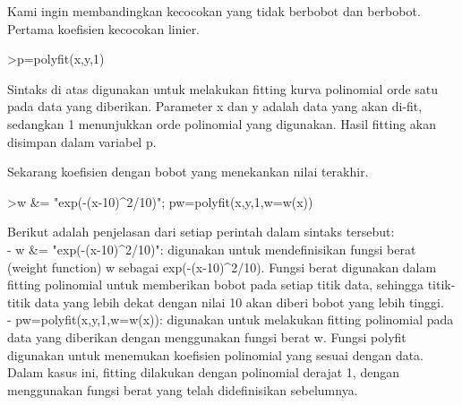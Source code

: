\documentclass[a4paper,10pt]{article}
\begin{document}
\begin{eulernotebook}
\begin{eulercomment}
\begin{eulercomment}
\begin{eulercomment}
\begin{eulercomment}
\begin{eulercomment}
\begin{eulercomment}
\begin{eulercomment}
\begin{eulercomment}
\begin{eulercomment}
\begin{eulercomment}
\begin{eulercomment}
\begin{eulercomment}
\begin{eulercomment}
\begin{eulercomment}
\begin{eulercomment}
\begin{eulercomment}
\begin{eulercomment}
Kami ingin membandingkan kecocokan yang tidak berbobot dan berbobot.
Pertama koefisien kecocokan linier.
\end{eulercomment}
\begin{eulerprompt}
>p=polyfit(x,y,1)
\end{eulerprompt}
\begin{euleroutput}
  [0.733333,  0.812121]
\end{euleroutput}
\begin{eulercomment}
Sintaks di atas digunakan untuk melakukan fitting kurva polinomial
orde satu pada data yang diberikan. Parameter x dan y adalah data yang
akan di-fit, sedangkan 1 menunjukkan orde polinomial yang digunakan.
Hasil fitting akan disimpan dalam variabel p.

Sekarang koefisien dengan bobot yang menekankan nilai terakhir.
\end{eulercomment}
\begin{eulerprompt}
>w &= "exp(-(x-10)^2/10)"; pw=polyfit(x,y,1,w=w(x))
\end{eulerprompt}
\begin{euleroutput}
  [4.71566,  0.38319]
\end{euleroutput}
\begin{eulercomment}
Berikut adalah penjelasan dari setiap perintah dalam sintaks tersebut:\\
- w \&= "exp(-(x-10)\textasciicircum{}2/10)": digunakan untuk mendefinisikan fungsi
berat (weight function) w sebagai exp(-(x-10)\textasciicircum{}2/10). Fungsi berat
digunakan dalam fitting polinomial untuk memberikan bobot pada setiap
titik data, sehingga titik-titik data yang lebih dekat dengan nilai 10
akan diberi bobot yang lebih tinggi.\\
- pw=polyfit(x,y,1,w=w(x)): digunakan untuk melakukan fitting
polinomial pada data yang diberikan dengan menggunakan fungsi berat w.
Fungsi polyfit digunakan untuk menemukan koefisien polinomial yang
sesuai dengan data. Dalam kasus ini, fitting dilakukan dengan
polinomial derajat 1, dengan menggunakan fungsi berat yang telah
didefinisikan sebelumnya.


\end{eulercomment}
\end{eulercomment}
\end{eulercomment}
\end{eulercomment}
\end{eulercomment}
\end{eulercomment}
\end{eulercomment}
\end{eulercomment}
\end{eulercomment}
\end{eulercomment}
\end{eulercomment}
\end{eulercomment}
\end{eulercomment}
\end{eulercomment}
\end{eulercomment}
\end{eulercomment}
\end{eulercomment}
\end{eulernotebook}
\end{document}
